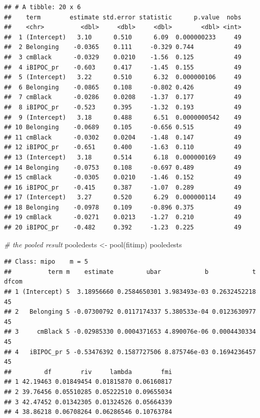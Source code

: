 \documentclass[
  11pt,
]{book}
\newenvironment{Shaded}{\begin{snugshade}}{\end{snugshade}}
\newcommand{\CommentTok}[1]{\textcolor[rgb]{0.56,0.35,0.01}{\textit{#1}}}
\newcommand{\FunctionTok}[1]{\textcolor[rgb]{0.00,0.00,0.00}{#1}}
\newcommand{\NormalTok}[1]{#1}
\newcommand{\OtherTok}[1]{\textcolor[rgb]{0.56,0.35,0.01}{#1}}
\begin{document}
\begin{verbatim}
## # A tibble: 20 x 6
##    term        estimate std.error statistic      p.value  nobs
##    <chr>          <dbl>     <dbl>     <dbl>        <dbl> <int>
##  1 (Intercept)   3.10      0.510      6.09  0.000000233     49
##  2 Belonging    -0.0365    0.111     -0.329 0.744           49
##  3 cmBlack      -0.0329    0.0210    -1.56  0.125           49
##  4 iBIPOC_pr    -0.603     0.417     -1.45  0.155           49
##  5 (Intercept)   3.22      0.510      6.32  0.000000106     49
##  6 Belonging    -0.0865    0.108     -0.802 0.426           49
##  7 cmBlack      -0.0286    0.0208    -1.37  0.177           49
##  8 iBIPOC_pr    -0.523     0.395     -1.32  0.193           49
##  9 (Intercept)   3.18      0.488      6.51  0.0000000542    49
## 10 Belonging    -0.0689    0.105     -0.656 0.515           49
## 11 cmBlack      -0.0302    0.0204    -1.48  0.147           49
## 12 iBIPOC_pr    -0.651     0.400     -1.63  0.110           49
## 13 (Intercept)   3.18      0.514      6.18  0.000000169     49
## 14 Belonging    -0.0753    0.108     -0.697 0.489           49
## 15 cmBlack      -0.0305    0.0210    -1.46  0.152           49
## 16 iBIPOC_pr    -0.415     0.387     -1.07  0.289           49
## 17 (Intercept)   3.27      0.520      6.29  0.000000114     49
## 18 Belonging    -0.0978    0.109     -0.896 0.375           49
## 19 cmBlack      -0.0271    0.0213    -1.27  0.210           49
## 20 iBIPOC_pr    -0.482     0.392     -1.23  0.225           49
\end{verbatim}

\begin{Shaded}
\begin{Highlighting}[]
\CommentTok{\# the pooled result}
\NormalTok{pooledests }\OtherTok{\textless{}{-}} \FunctionTok{pool}\NormalTok{(fitimp)}
\NormalTok{pooledests}
\end{Highlighting}
\end{Shaded}

\begin{verbatim}
## Class: mipo    m = 5 
##          term m    estimate         ubar            b            t dfcom
## 1 (Intercept) 5  3.18956660 0.2584650301 3.983493e-03 0.2632452218    45
## 2   Belonging 5 -0.07300792 0.0117174337 5.380533e-04 0.0123630977    45
## 3     cmBlack 5 -0.02985330 0.0004371653 4.890076e-06 0.0004430334    45
## 4   iBIPOC_pr 5 -0.53476392 0.1587727506 8.875746e-03 0.1694236457    45
##         df        riv     lambda        fmi
## 1 42.19463 0.01849454 0.01815870 0.06160817
## 2 39.76456 0.05510285 0.05222510 0.09655034
## 3 42.47452 0.01342305 0.01324526 0.05664339
## 4 38.86218 0.06708264 0.06286546 0.10763784
\end{verbatim}
\end{document}
